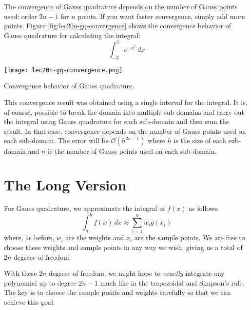 The convergence of Gauss quadrature depends on the number of Gauss points used: order $2n-1$ for $n$ points.  If you want faster convergence, simply add more points.  Figure \ref{fig:lec20n-gq-convergence} shows the convergence behavior of Gauss quadrature for calculating the integral:
\begin{equation*}
\int_{-3}^3 e^{-x^2} \ dx
\end{equation*}
\begin{marginfigure}
\texttt{[image: lec20n-gq-convergence.png]}
\caption{Convergence behavior of Gauss quadrature.}
\label{fig:lec20n-gq-convergence}
\end{marginfigure}
This convergence result was obtained using a single interval for the integral.  It is, of course, possible to break the domain into multiple sub-domains and carry out the integral using Gauss quadrature for each sub-domain and then sum the result.  In that case, convergence depends on the number of Gauss points used on each sub-domain.  The error will be $\mathcal{O}(h^{2n-1})$ where $h$ is the size of each sub-domain and $n$ is the number of Gauss points used on each sub-domain.


\section{The Long Version}

For Gauss quadrature, we approximate the integral of $f(x)$ as follows:
\begin{equation*}
\int_{a}^{b} f(x) \ dx \approx \sum\limits_{i=1}^{n}w_i g(x_i)
\end{equation*}
where, as before, $w_i$ are the weights and $x_i$ are the sample points.  We are free to choose these weights and sample points in any way we wish, giving us a total of $2n$ degrees of freedom.

With these $2n$ degrees of freedom, we might hope to \emph{exactly} integrate any polynomial up to degree $2n-1$ much like in the trapezoidal and Simpson's rule.  The key is to choose the sample points and weights carefully so that we can achieve this goal.

